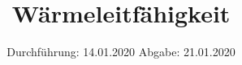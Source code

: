 

\subject{Versuch 204}
\title{Wärmeleitfähigkeit}
\date{%
  Durchführung: 14.01.2020
  \hspace{3em}
  Abgabe: 21.01.2020
}



\maketitle

\thispagestyle{empty}
\tableofcontents
\newpage



%



%

\printbibliography{}



